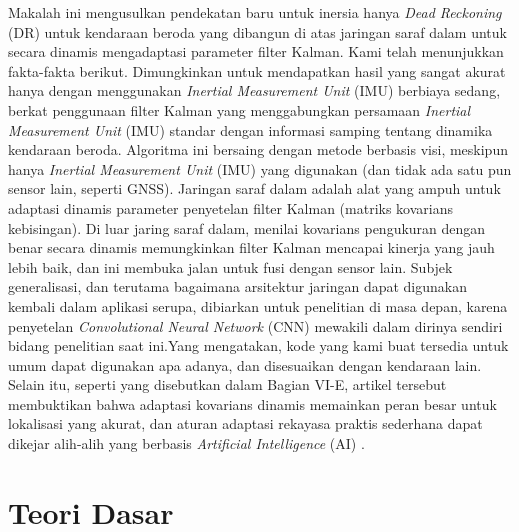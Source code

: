 Makalah ini mengusulkan pendekatan baru untuk inersia hanya \emph{Dead Reckoning} (DR) untuk kendaraan beroda yang dibangun di atas jaringan saraf 
dalam untuk secara dinamis mengadaptasi parameter filter Kalman. Kami telah menunjukkan fakta-fakta berikut. Dimungkinkan untuk mendapatkan 
hasil yang sangat akurat hanya dengan menggunakan \emph{Inertial Measurement Unit} (IMU) berbiaya sedang, berkat penggunaan filter Kalman yang menggabungkan persamaan \emph{Inertial Measurement Unit} (IMU) 
standar dengan informasi samping tentang dinamika kendaraan beroda. Algoritma ini bersaing dengan metode berbasis visi, meskipun hanya \emph{Inertial Measurement Unit} (IMU) 
yang digunakan (dan tidak ada satu pun sensor lain, seperti GNSS). Jaringan saraf dalam adalah alat yang ampuh untuk adaptasi dinamis parameter penyetelan filter Kalman (matriks kovarians kebisingan). 
Di luar jaring saraf dalam, menilai kovarians pengukuran dengan benar secara dinamis memungkinkan filter Kalman mencapai kinerja yang jauh lebih baik, dan ini membuka jalan untuk fusi dengan sensor lain. 
Subjek generalisasi, dan terutama bagaimana arsitektur jaringan dapat digunakan kembali dalam aplikasi serupa, dibiarkan untuk penelitian di masa depan, karena penyetelan \emph{Convolutional Neural Network} (CNN) 
mewakili dalam dirinya sendiri bidang penelitian saat ini.Yang mengatakan, kode yang kami buat tersedia untuk umum dapat digunakan apa adanya, dan disesuaikan dengan kendaraan lain. 
Selain itu, seperti yang disebutkan dalam Bagian VI-E, artikel tersebut membuktikan bahwa adaptasi kovarians dinamis memainkan peran besar untuk lokalisasi yang akurat, 
dan aturan adaptasi rekayasa praktis sederhana dapat dikejar alih-alih yang berbasis \emph{Artificial Intelligence} (AI) \parencite{Brossard2020}.

\section{Teori Dasar}

